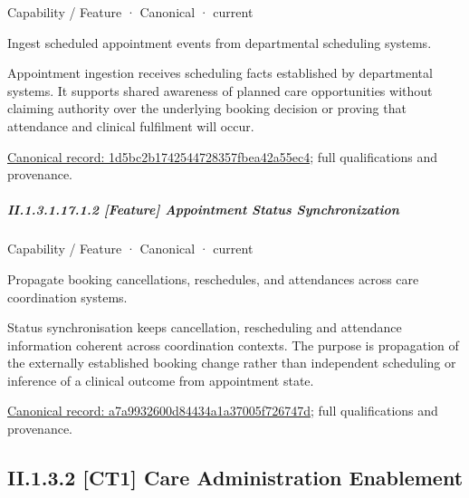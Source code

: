 \label{element:1d5bc2b1742544728357fbea42a55ec4}
{\small Capability / Feature · Canonical · current}\par

Ingest scheduled appointment events from departmental scheduling systems.



Appointment ingestion receives scheduling facts established by departmental systems. It supports shared awareness of planned care opportunities without claiming authority over the underlying booking decision or proving that attendance and clinical fulfilment will occur.


{\footnotesize \href{../../../../continuum/strategy/capability/feature/1d5bc2b1742544728357fbea42a55ec4.md}{Canonical record: 1d5bc2b1742544728357fbea42a55ec4}; full qualifications and provenance.}\par
\subparagraph*{II.1.3.1.17.1.2 [Feature] Appointment Status Synchronization}
\label{navigation:II.1.3.1.17.1.2}

\label{element:a7a9932600d84434a1a37005f726747d}
{\small Capability / Feature · Canonical · current}\par

Propagate booking cancellations, reschedules, and attendances across care coordination systems.



Status synchronisation keeps cancellation, rescheduling and attendance information coherent across coordination contexts. The purpose is propagation of the externally established booking change rather than independent scheduling or inference of a clinical outcome from appointment state.


{\footnotesize \href{../../../../continuum/strategy/capability/feature/a7a9932600d84434a1a37005f726747d.md}{Canonical record: a7a9932600d84434a1a37005f726747d}; full qualifications and provenance.}\par
\subsection*{II.1.3.2 [CT1] Care Administration Enablement}
\label{navigation:II.1.3.2}


